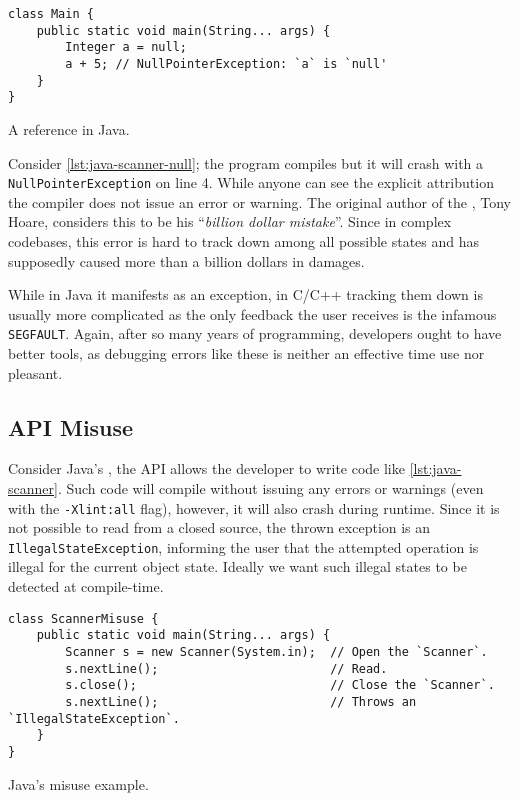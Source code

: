\begin{listing}
    \begin{verbatim}
class Main {
    public static void main(String... args) {
        Integer a = null;
        a + 5; // NullPointerException: `a` is `null'
    }
}
    \end{verbatim}
    \caption{A  reference in Java.}
    \label{lst:java-scanner-null}
\end{listing}

Consider \autoref{lst:java-scanner-null}; the program compiles but it will crash with a \texttt{NullPointerException} on line 4.
While anyone can see the explicit  attribution the compiler does not issue an error or warning.
The original author of the , Tony Hoare, considers this to be his “\emph{billion dollar mistake}”.
Since in complex codebases, this error is hard to track down among all possible states and
has supposedly caused more than a billion dollars in damages.

While in Java it manifests as an exception,
in C/C++ tracking them down is usually more complicated as the only feedback the user receives is the infamous \texttt{SEGFAULT}.
Again, after so many years of programming, developers ought to have better tools,
as debugging errors like these is neither an effective time use nor pleasant.

\subsection{API Misuse}

Consider Java's , the \gls{API} allows the developer to write code like \autoref{lst:java-scanner}.
Such code will compile without issuing any errors or warnings (even with the \texttt{-Xlint:all} flag),
however, it will also crash during runtime.
Since it is not possible to read from a closed source, the thrown exception is an \texttt{IllegalStateException},
informing the user that the attempted operation is illegal for the current object state.
Ideally we want such illegal states to be detected at compile-time.

\begin{listing}
    \begin{verbatim}
class ScannerMisuse {
    public static void main(String... args) {
        Scanner s = new Scanner(System.in);  // Open the `Scanner`.
        s.nextLine();                        // Read.
        s.close();                           // Close the `Scanner`.
        s.nextLine();                        // Throws an `IllegalStateException`.
    }
}
    \end{verbatim}
    \caption{Java's  misuse example.}
    \label{lst:java-scanner}
\end{listing}

